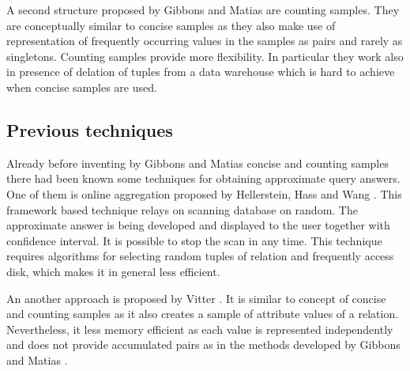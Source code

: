 A second structure proposed by Gibbons and Matias \cite{GM98} are
counting samples. They are conceptually similar to concise
samples as they also make use of representation of frequently
occurring values in the samples as pairs and rarely as singletons.
Counting samples provide more flexibility. In particular they work also in
presence of delation of tuples from a data warehouse which is hard to
achieve when concise samples are used.

\subsection{Previous techniques}
Already before inventing by Gibbons and Matias \cite{GM98} concise and
counting samples there had been known some techniques for obtaining
approximate query answers. One of them is online aggregation
proposed by Hellerstein, Hass and Wang \cite{HHW97}. This
framework based technique relays on scanning database on random.
The approximate answer is being developed
and displayed to the user together with confidence interval. It is
possible to stop the scan in any time. This technique requires
algorithms for selecting random tuples of relation and frequently access
disk, which makes it in general less efficient.

An another approach is proposed by Vitter \cite{Vit85}. It is
similar to concept of concise and counting samples as it also creates
a sample of attribute values of a relation. Nevertheless, it less
memory efficient as each value is represented independently and does
not provide accumulated pairs as in the methods developed by Gibbons
and Matias \cite{GM98}.


